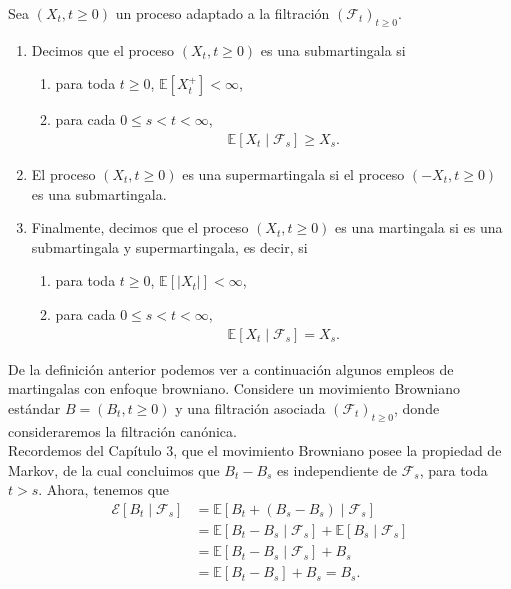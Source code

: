 \begin{definition}
	Sea $(X_t, t \geq 0)$ un proceso adaptado a la filtración $(\mathcal{F}_t)_{t \geq 0}$.
    \begin{enumerate}
	\item Decimos que el proceso $(X_t, t \geq 0)$ es una submartingala si
    	\begin{enumerate}
		\item para toda $t \geq 0$, $\mathbb{E}[X_t^{+}] < \infty$,
        \item para cada $0 \leq s < t < \infty$,
        \begin{align*}
			\mathbb{E}[X_t \mid \mathcal{F}_s] \geq X_s.
		\end{align*}
		\end{enumerate}
    \item El proceso $(X_t, t \geq 0)$ es una supermartingala si el proceso $(-X_t, t \geq 0)$ es una submartingala.
    \item Finalmente, decimos que el proceso $(X_t, t \geq 0)$ es una martingala si es una submartingala y supermartingala, es decir, si
    \begin{enumerate}
	\item para toda $t \geq 0$, $\mathbb{E}[|X_t|] < \infty$,
    \item para cada $0 \leq s < t < \infty$,
 	   \begin{align*}
			\mathbb{E}[X_t \mid \mathcal{F}_s] = X_s.
		\end{align*}
	\end{enumerate}
	\end{enumerate}
\end{definition}

De la definición anterior podemos ver a continuación algunos empleos de martingalas con enfoque browniano. Considere un movimiento Browniano estándar $B = (B_t, t \geq 0)$ y una filtración asociada $(\mathcal{F}_t)_{t \geq 0}$, donde consideraremos la filtración canónica. \\

Recordemos del Capítulo 3, que el movimiento Browniano posee la propiedad de Markov, de la cual concluimos que $B_t - B_s$ es independiente de $\mathcal{F}_s$, para toda $t > s$. Ahora, tenemos que
\begin{align*}
	\mathcal{E}[B_t \mid \mathcal{F}_s] & = \mathbb{E}[B_t + (B_s - B_s) \mid \mathcal{F}_s] \\
    & = \mathbb{E}[B_t - B_s \mid \mathcal{F}_s] + \mathbb{E}[B_s \mid \mathcal{F}_s] \\
    & = \mathbb{E}[B_t - B_s \mid \mathcal{F}_s] + B_s \\
    & = \mathbb{E}[B_t - B_s] + B_s = B_s.
\end{align*}

